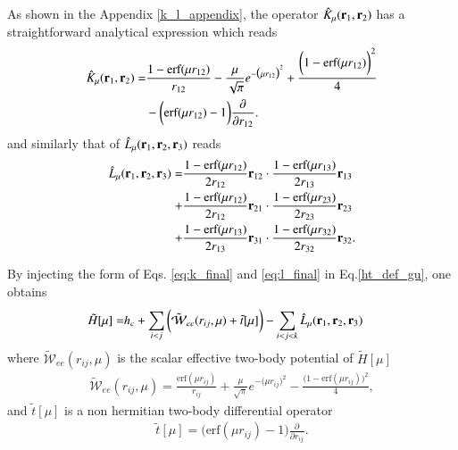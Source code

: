 \documentclass[aip,jcp,reprint,noshowkeys,superscriptaddress]{revtex4-1}
\newcommand{\deriv}[3]{\frac{\partial^{#3} #1}{\partial {#2}^{#3}}}
\newcommand{\bri}[1]{{\bf r}_{#1}}
\begin{document}
As shown in the Appendix \ref{k_l_appendix}, the operator $\hat{K}_\mu(\bri{1},\bri{2})$ has a straightforward analytical expression which reads 
\begin{equation}
 \label{eq:k_final}
  \begin{aligned}
   \hat{K}_\mu(\bri{1},\bri{2}) = & \frac{1 - \text{erf}(\mu r_{12})}{r_{12}} - \frac{\mu}{\sqrt{\pi}} e^{-\big(\mu r_{12} \big)^2} + \frac{\bigg(1 -     \text{erf}(\mu r_{12}) \bigg)^2}{4} \\
& - \bigg( \text{erf}(\mu r_{12}) - 1\bigg) \deriv{}{r_{12}}{}.
  \end{aligned}
\end{equation}
and similarly that of $\hat{L}_\mu(\bri{1},\bri{2},\bri{3}) $ reads 
\begin{equation}
 \label{eq:l_final}
 \begin{aligned}
 \hat{L}_\mu(\bri{1},\bri{2},\bri{3}) = & \frac{1 - \text{erf}(\mu r_{12})}{2 r_{12}} \bri{12} \cdot \frac{1 - \text{erf}(\mu r_{13})}{2 r_{13}} \bri{13} \\
                                      + & \frac{1 - \text{erf}(\mu r_{12})}{2 r_{12}} \bri{21} \cdot \frac{1 - \text{erf}(\mu r_{23})}{2 r_{23}} \bri{23} \\
                                      + & \frac{1 - \text{erf}(\mu r_{13})}{2 r_{13}} \bri{31} \cdot \frac{1 - \text{erf}(\mu r_{32})}{2 r_{32}} \bri{32}.
 \end{aligned}                    
\end{equation}

By injecting the form of Eqs. \eqref{eq:k_final} and \eqref{eq:l_final} in Eq.\eqref{ht_def_gu}, one obtains 
\begin{equation}
  \begin{aligned}
 \label{eq:exp_ht_mu}
   \tilde{H}[\mu] = & h_c + \sum_{i<j} \bigg( \tilde{\mathcal{W}}_{ee}(r_{ij},\mu) + \tilde{t}[\mu] \bigg) - \sum_{i<j<k} \hat{L}_\mu(\bri{1},\bri{2},\bri{3})
  \end{aligned}
\end{equation}
where $ \tilde{\mathcal{W}}_{ee}(r_{ij},\mu)$ is the scalar effective two-body potential of  $\tilde{H}[\mu]$
\begin{equation}
 \begin{aligned}
 \tilde{\mathcal{W}}_{ee}(r_{ij},\mu)  =  \frac{\text{erf}(\mu r_{ij})}{r_{ij}} + \frac{\mu}{\sqrt{\pi}} e^{-\big(\mu r_{ij} \big)^2} - \frac{\bigg(1 -     \text{erf}(\mu r_{ij}) \bigg)^2}{4}, 
 \end{aligned}
\end{equation}
and $\tilde{t}[\mu]$ is a non hermitian two-body differential operator 
\begin{equation}
 \begin{aligned}
 \tilde{t}[\mu] =  \bigg( \text{erf}(\mu r_{ij}) - 1\bigg) \deriv{}{r_{ij}}{}.
 \end{aligned}
\end{equation}
\end{document}
